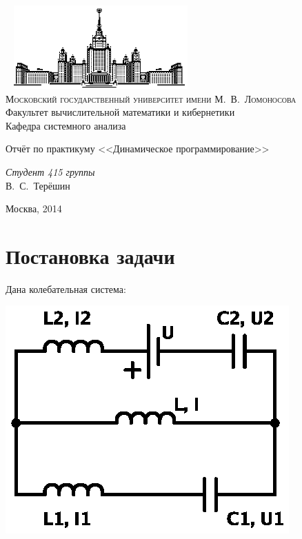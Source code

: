 \documentclass[11pt]{article}
\begin{document}
\thispagestyle{empty}

\begin{center}
\ \vspace{-3cm} \newline
\includegraphics[width=0.5\textwidth]{msu.eps}\\
{\scshape Московский государственный университет имени М.~В.~Ломоносова}\\
Факультет вычислительной математики и кибернетики\\
Кафедра системного анализа

\vfill

{\LARGE Отчёт по практикуму <<Динамическое программирование>>} \newline
{\Huge\bfseries }
\end{center}

\vspace{1cm}
\begin{flushright}
\large
\textit{Студент 415 группы}\\
В.~С.~Терёшин\\
\end{flushright}

\vfill
\begin{center}
Москва, 2014
\end{center}
\pagebreak
\tableofcontents
\pagebreak
\section{Постановка задачи}
Дана колебательная система:

\includegraphics[scale=1.0]{circuit.eps}
\end{document}
